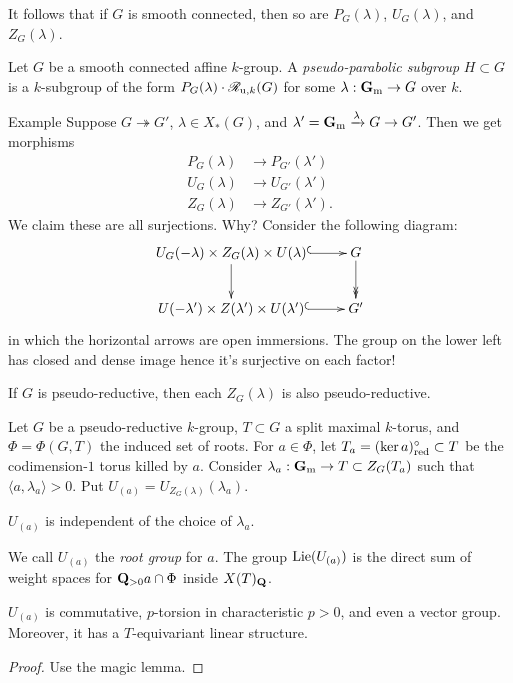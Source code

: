It follows that if $G$ is smooth connected, then so are $P_G(\lambda)$, 
$U_G(\lambda)$, and $Z_G(\lambda)$. 

\begin{defi}
Let $G$ be a smooth connected affine $k$-group. A \emph{pseudo-parabolic 
subgroup} $H\subset G$ is a $k$-subgroup of the form 
$P_G(\lambda)\cdot \mathscr{R}_{\mathrm{u},k}(G)$ for some $\lambda:\mathbf{G}_{\mathrm{m}} \to G$ 
over $k$. 
\end{defi}

\begin{enonce}[remark]{Example}
Suppose $G\twoheadrightarrow G'$, $\lambda\in X_\ast(G)$, and 
$\lambda'=\mathbf{G}_{\mathrm{m}}\xrightarrow\lambda G \to G'$. Then we get morphisms 
\begin{align*}
  P_G(\lambda) &\to P_{G'}(\lambda') \\
  U_G(\lambda) &\to U_{G'}(\lambda') \\
  Z_G(\lambda) &\to Z_{G'}(\lambda') .
\end{align*}
We claim these are all surjections. Why? Consider the following diagram:
\[\xymatrix{
  U_G(-\lambda)\times Z_G(\lambda)\times U(\lambda) \ar@{^{(}->}[r] \ar[d] 
    & G \ar@{->>}[d] \\
  U(-\lambda')\times Z(\lambda')\times U(\lambda') \ar@{^{(}->}[r] 
    & G' 
}\]
in which the horizontal arrows are open immersions. The group on the lower 
left has closed and dense image hence it's surjective on each factor! 
\end{enonce}

If $G$ is pseudo-reductive, then each $Z_G(\lambda)$ is also pseudo-reductive. 

Let $G$ be a pseudo-reductive $k$-group, $T\subset G$ a split maximal 
$k$-torus, and $\Phi=\Phi(G,T)$ the induced set of roots. For 
$a\in \Phi$, let $T_a=(\ker a)^\circ_{\mathrm{red}}\subset T$ be the codimension-$1$ 
torus killed by $a$. Consider $\lambda_a:\mathbf{G}_{\mathrm{m}} \to T\subset Z_G(T_a)$ 
such that $\langle a,\lambda_a\rangle > 0$. Put 
$U_{(a)}=U_{Z_G(\lambda)}(\lambda_a)$. 

\begin{prop}
$U_{(a)}$ is independent of the choice of $\lambda_a$. 
\end{prop}

We call $U_{(a)}$ the \emph{root group} for $a$. The group 
$\operatorname{Lie}(U_{(a)})$ is the direct sum of weight spaces for $\mathbf{Q}_{>0} a\cap \Phi$ 
inside $X(T)_{\mathbf{Q}}$. 

\begin{prop}
$U_{(a)}$ is commutative, $p$-torsion in characteristic $p>0$, and even a vector group. 
Moreover, it has a $T$-equivariant linear structure. 
\end{prop}
\begin{proof}
Use the magic lemma. 
\end{proof}

